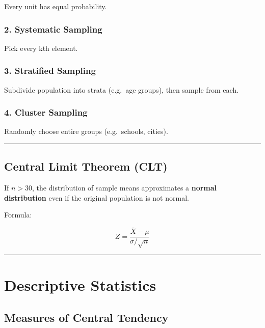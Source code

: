 \documentclass[
  letterpaper,
  DIV=11,
  numbers=noendperiod]{scrreprt}
\begin{document}
Every unit has equal probability.

\subsubsection{2. Systematic Sampling}\label{systematic-sampling}

Pick every kth element.

\subsubsection{3. Stratified Sampling}\label{stratified-sampling}

Subdivide population into strata (e.g.~age groups), then sample from
each.

\subsubsection{4. Cluster Sampling}\label{cluster-sampling}

Randomly choose entire groups (e.g.~schools, cities).

\begin{center}\rule{0.5\linewidth}{0.5pt}\end{center}

\subsection{Central Limit Theorem
(CLT)}\label{central-limit-theorem-clt}

If \(n > 30\), the distribution of sample means approximates a
\textbf{normal distribution} even if the original population is not
normal.

Formula:

\[
Z = \frac{\bar{X} - \mu}{\sigma / \sqrt{n}}
\]

\begin{center}\rule{0.5\linewidth}{0.5pt}\end{center}

\section{Descriptive Statistics}\label{descriptive-statistics-1}

\subsection{Measures of Central
Tendency}\label{measures-of-central-tendency-1}
\end{document}
